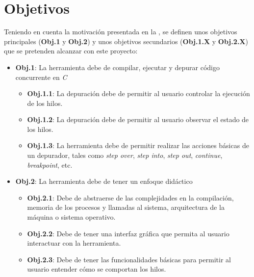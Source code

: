 \section{Objetivos}\label{sec:objetivos}
Teniendo en cuenta la motivación presentada en la , se definen unos objetivos principales (\textbf{Obj.1} y \textbf{Obj.2}) y unos objetivos secundarios (\textbf{Obj.1.X} y \textbf{Obj.2.X}) que se pretenden alcanzar con este proyecto:
\begin{itemize}

    \item \textbf{Obj.1}: La herramienta debe de compilar, ejecutar y depurar código concurrente en \textit{C}
    \begin{itemize}
        \item \textbf{Obj.1.1}: La depuración debe de permitir al usuario controlar la ejecución de los hilos.
        \item \textbf{Obj.1.2}: La depuración debe de permitir al usuario observar el estado de los hilos.
        \item \textbf{Obj.1.3}: La herramienta debe de permitir realizar las acciones básicas de un depurador, tales como \textit{step over}, \textit{step into}, \textit{step out}, \textit{continue}, \textit{breakpoint}, etc.
    \end{itemize}
     
    \item \textbf{Obj.2}: La herramienta debe de tener un enfoque didáctico\label{obj:didactico}
    \begin{itemize}
        \item \textbf{Obj.2.1}: Debe de abstraerse de las complejidades en la compilación, memoria de los procesos y llamadas al sistema, arquitectura de la máquina o sistema operativo.
        \item \textbf{Obj.2.2}: Debe de tener una \gls{interfaz gráfica} que permita al usuario interactuar con la herramienta.
        \item \textbf{Obj.2.3}: Debe de tener las funcionalidades básicas para permitir al usuario entender cómo se comportan los hilos.
    \end{itemize}

\end{itemize}

